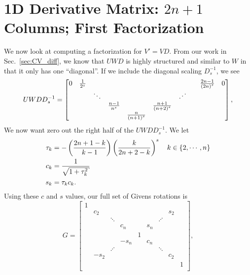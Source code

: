 \section{1D \CV{} Derivative Matrix: $2n+1$ Columns; First Factorization}
\label{sec:CV_D_1D_2n_F2}

We now look at computing a factorization for $V' = VD$.
From our work in Sec.~\ref{sec:CV_diff}, we know that $UWD$ is highly
structured and similar to $W$ in that it only has one ``diagonal''.
If we include the diagonal scaling $D_{s}^{-1}$, we see
%
\begin{equation}
    UWDD_{s}^{-1} =
    \begin{bmatrix}
    0 & \frac{1}{2^{s}} & & & & & & & \frac{2n-1}{\left( 2n \right)^{s}} & 0 \\
      & & \ddots & & & & \iddots & \\
      & & & \frac{n-1}{n^{s}} & & \frac{n+1}{\left( n+2 \right)^{s}} \\
      & & & & \frac{n}{\left( n+1 \right)^{s}} \\
    \end{bmatrix},
\end{equation}
%
We now want zero out the right half of the $UWDD_{s}^{-1}$.
We let
%
\begin{align}
    \tau_{k} &= -\parens{\frac{2n+1-k}{k-1}}\parens{\frac{k}{2n+2-k}}^{s}
        \quad k\in\braces{2,\cdots,n} \nonumber\\
    c_{k} &= \frac{1}{\sqrt{1 + \tau_{k}^{2}}} \nonumber\\
    s_{k} &= \tau_{k}c_{k}.
    \label{eq:v1_D_2n_Givens_cs_def}
\end{align}
%
Using these $c$ and $s$ values, our full set of Givens rotations is
%
\begin{equation}
    G = \begin{bmatrix}
        1     &       &        &       &      &       &        &       &      \\
              & c_{2} &        &       &      &       &        & s_{2} &      \\
              &       & \ddots &       &      &       & \iddots&       &      \\
              &       &        & c_{n} &      & s_{n} &        &       &      \\
              &       &        &       &    1 &       &        &       &      \\
              &       &        & -s_{n}&      & c_{n} &        &       &      \\
              &       & \iddots&       &      &       & \ddots &       &      \\
              &-s_{2} &        &       &      &       &        & c_{2} &      \\
              &       &        &       &      &       &        &       & 1    \\
        \end{bmatrix},
    \label{eq:vand_D_Givens}
\end{equation}
